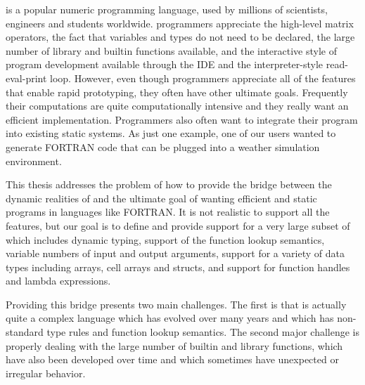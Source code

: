 \matlab is a popular numeric programming language, used by millions of
scientists, engineers and students worldwide\cite{MatlabGrowth}.  \matlab
programmers appreciate the high-level matrix operators,  the fact that
variables and types do not need to be declared, the large number of library and
builtin functions available, and the interactive style of program development
available through the IDE and the interpreter-style read-eval-print loop.
However, even though \matlab programmers appreciate all of the features that
enable rapid prototyping,  they often have other ultimate goals.  Frequently
their computations are quite computationally intensive and they really want an
efficient implementation.  Programmers also often want to integrate their
\matlab program into existing static systems.  As just one example, one of our
users wanted to generate {\sc FORTRAN} code that can be plugged into a weather
simulation environment.    

This thesis addresses the problem of how to provide the bridge between
the dynamic realities of \matlab and the ultimate goal of wanting
efficient and static programs in languages like {\sc FORTRAN}.  It is
not realistic to support all the \matlab features, but our goal is to
define and provide support for a very large subset of \matlab which
includes dynamic typing, support of the \matlab function lookup
semantics, variable numbers of input and output arguments, support for
a variety of \matlab data types including arrays, cell arrays and
structs, and support for function handles and lambda expressions.

Providing this bridge presents two main challenges.  The first is that \matlab
is actually quite a complex language which has evolved over many years and
which has non-standard type rules and function lookup semantics.  The second
major challenge is properly dealing with the large number of builtin and
library functions,  which have also been developed over time and which
sometimes have unexpected or irregular behavior. 

